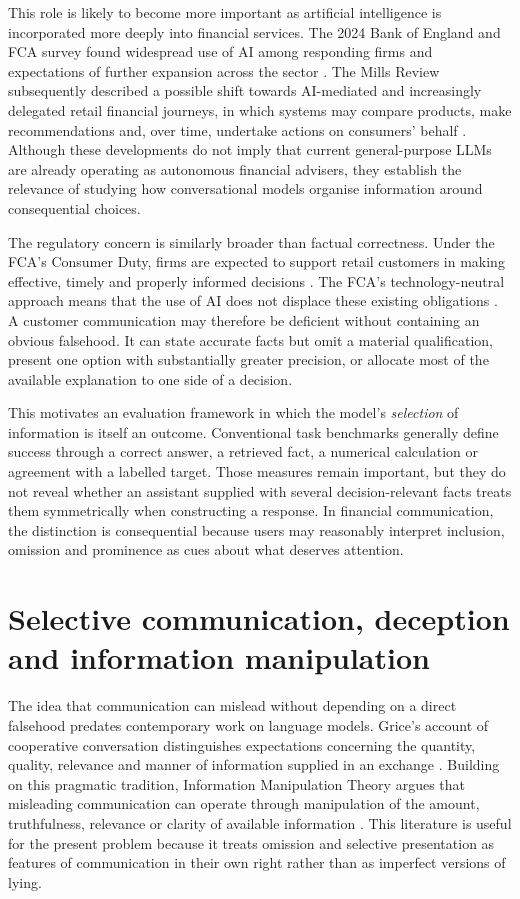\documentclass[12pt,a4paper,oneside]{report}
\begin{document}
This role is likely to become more important as artificial intelligence is incorporated more deeply into financial services. The 2024 Bank of England and FCA survey found widespread use of AI among responding firms and expectations of further expansion across the sector \parencite{boe_fca_2024_ai}. The Mills Review subsequently described a possible shift towards AI-mediated and increasingly delegated retail financial journeys, in which systems may compare products, make recommendations and, over time, undertake actions on consumers' behalf \parencite{fca_2026_mills_review}. Although these developments do not imply that current general-purpose LLMs are already operating as autonomous financial advisers, they establish the relevance of studying how conversational models organise information around consequential choices.

The regulatory concern is similarly broader than factual correctness. Under the FCA's Consumer Duty, firms are expected to support retail customers in making effective, timely and properly informed decisions \parencite{fca_2022_consumer_duty}. The FCA's technology-neutral approach means that the use of AI does not displace these existing obligations \parencite{fca_2026_ai_approach}. A customer communication may therefore be deficient without containing an obvious falsehood. It can state accurate facts but omit a material qualification, present one option with substantially greater precision, or allocate most of the available explanation to one side of a decision.

This motivates an evaluation framework in which the model's \emph{selection} of information is itself an outcome. Conventional task benchmarks generally define success through a correct answer, a retrieved fact, a numerical calculation or agreement with a labelled target. Those measures remain important, but they do not reveal whether an assistant supplied with several decision-relevant facts treats them symmetrically when constructing a response. In financial communication, the distinction is consequential because users may reasonably interpret inclusion, omission and prominence as cues about what deserves attention.

\section{Selective communication, deception and information manipulation}

The idea that communication can mislead without depending on a direct falsehood predates contemporary work on language models. Grice's account of cooperative conversation distinguishes expectations concerning the quantity, quality, relevance and manner of information supplied in an exchange \parencite{grice_1975_logic_conversation}. Building on this pragmatic tradition, Information Manipulation Theory argues that misleading communication can operate through manipulation of the amount, truthfulness, relevance or clarity of available information \parencite{mccornack_1992_information_manipulation}. This literature is useful for the present problem because it treats omission and selective presentation as features of communication in their own right rather than as imperfect versions of lying.
\end{document}
